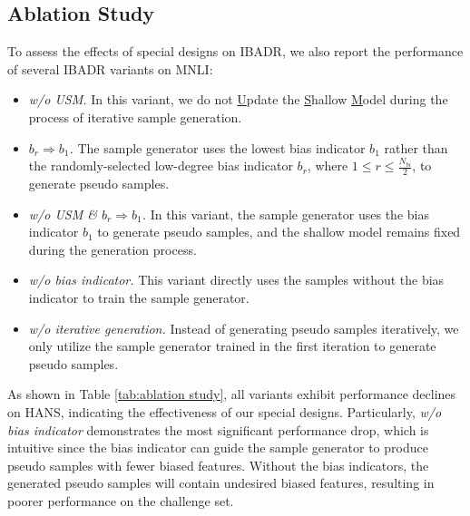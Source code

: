\documentclass[11pt]{article}
\def\model{\textsc{IBADR}\xspace}
\begin{document}
\subsection{Ablation Study}
To assess the effects of special designs on \model, we also report the performance of several \model variants on MNLI:
\begin{itemize}
\item \emph{w/o USM.} In this variant, we do not \underline{U}pdate the \underline{S}hallow \underline{M}odel during the process of iterative sample generation.

\item \emph{$b_r$$\Rightarrow$$b_1$.} The sample generator uses the lowest bias indicator $b_1$ rather than the randomly-selected low-degree bias indicator $b_r$, where $1$$\leq$$r$$\leq$$\frac{N_{bi}}{2}$, to generate pseudo samples.

\item  \emph{w/o USM \& $b_r$$\Rightarrow$$b_1$.} In this variant, the sample generator uses the bias indicator $b_1$ to generate pseudo samples, and the shallow model remains fixed during the generation process. 

\item  \emph{w/o bias indicator.} This variant directly uses the samples without the bias indicator to train the sample generator.


\item  \emph{w/o iterative generation.} Instead of generating pseudo samples iteratively, we only utilize the sample generator trained in the first iteration to generate pseudo samples. 
\end{itemize}
As shown in Table \ref{tab:ablation study}, all variants exhibit performance declines on HANS, indicating the effectiveness of our special designs. Particularly, \textit{w/o bias indicator} demonstrates the most significant performance drop, which is intuitive since the bias indicator can guide the sample generator to produce pseudo samples with fewer biased features. Without the bias indicators, the generated pseudo samples will contain undesired biased features, resulting in poorer performance on the challenge set.
\end{document}
